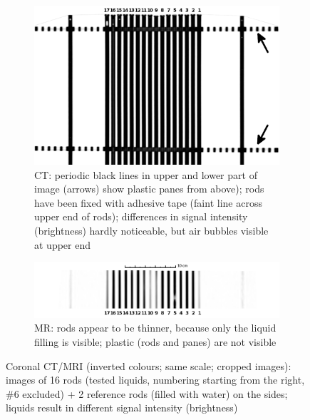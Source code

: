 \documentclass[parskip,bibtotoc,final,twoside=false,titlepage,a4paper,english,12pt,titlepage,a4paper]{scrbook}
\begin{document}
\begin{figure}[!tbp]
  \begin{subfigure}[b]{\textwidth}
    \includegraphics[width=\textwidth]{slicer3D/full_phantom/coronal_CT_cropped-arrow.png}
    \caption{CT: periodic black lines in upper and lower part of image (arrows) show plastic panes from above); rods have been fixed with adhesive tape (faint line across upper end of rods); differences in signal intensity (brightness) hardly noticeable, but air bubbles visible at upper end}
    \label{fig:coronal_CT}
  \end{subfigure}
  \begin{subfigure}[b]{1\textwidth}
    \includegraphics[width=1\textwidth]{slicer3D/full_phantom/coronal_MR_cropped.png}
    \caption{MR: rods appear to be thinner, because only the liquid filling is visible; plastic (rods and panes) are not visible}
    \label{fig:coronal_MR}
  \end{subfigure}
  \caption{Coronal CT/MRI (inverted colours; same scale; cropped images): images of 16 rods (tested liquids, numbering starting from the right, \#6 excluded) + 2 reference rods (filled with water) on the sides; liquids result in different signal intensity (brightness)}
  \label{fig:coronal}
\end{figure}
\end{document}
